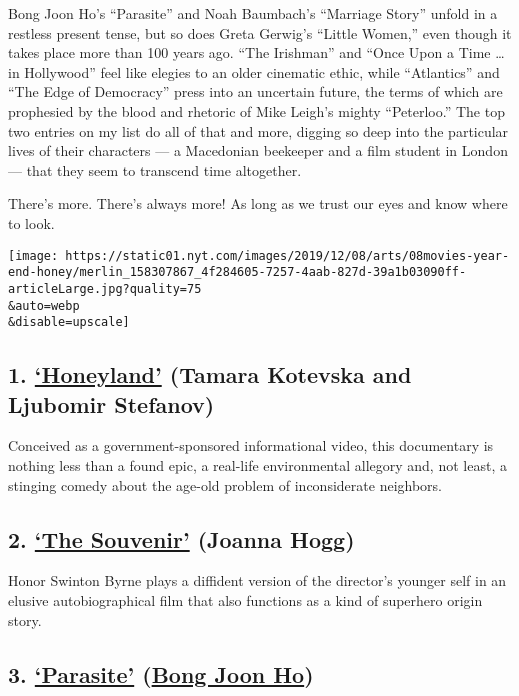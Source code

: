 Bong Joon Ho's ``Parasite'' and Noah Baumbach's ``Marriage Story''
unfold in a restless present tense, but so does Greta Gerwig's ``Little
Women,'' even though it takes place more than 100 years ago. ``The
Irishman'' and ``Once Upon a Time \ldots{} in Hollywood'' feel like
elegies to an older cinematic ethic, while ``Atlantics'' and ``The Edge
of Democracy'' press into an uncertain future, the terms of which are
prophesied by the blood and rhetoric of Mike Leigh's mighty
``Peterloo.'' The top two entries on my list do all of that and more,
digging so deep into the particular lives of their characters --- a
Macedonian beekeeper and a film student in London --- that they seem to
transcend time altogether.

There's more. There's always more! As long as we trust our eyes and know
where to look.

\texttt{[image: https://static01.nyt.com/images/2019/12/08/arts/08movies-year-end-honey/merlin\_158307867\_4f284605-7257-4aab-827d-39a1b03090ff-articleLarge.jpg?quality=75\\\&auto=webp\\\&disable=upscale]}

\hypertarget{1-honeyland-tamara-kotevska-and-ljubomir-stefanov}{%
\subsection{\texorpdfstring{1.
\href{https://www.nytimes.com/2019/07/25/movies/honeyland-review.html}{`Honeyland'}
(Tamara Kotevska and Ljubomir
Stefanov)}{1. `Honeyland' (Tamara Kotevska and Ljubomir Stefanov)}}\label{1-honeyland-tamara-kotevska-and-ljubomir-stefanov}}

Conceived as a government-sponsored informational video, this
documentary is nothing less than a found epic, a real-life environmental
allegory and, not least, a stinging comedy about the age-old problem of
inconsiderate neighbors.

\hypertarget{2-the-souvenir-joanna-hogg}{%
\subsection{\texorpdfstring{2.
\href{https://www.nytimes.com/2019/05/16/movies/the-souvenir-review.html}{`The
Souvenir'} (Joanna
Hogg)}{2. `The Souvenir' (Joanna Hogg)}}\label{2-the-souvenir-joanna-hogg}}

Honor Swinton Byrne plays a diffident version of the director's younger
self in an elusive autobiographical film that also functions as a kind
of superhero origin story.

\hypertarget{3-parasite-bong-joon-ho}{%
\subsection{\texorpdfstring{3.
\href{https://www.nytimes.com/2019/10/10/movies/parasite-review.html}{`Parasite'}
(\href{https://www.nytimes.com/2019/10/30/movies/bong-joon-ho-parasite.html}{Bong
Joon
Ho})}{3. `Parasite' (Bong Joon Ho)}}\label{3-parasite-bong-joon-ho}}

